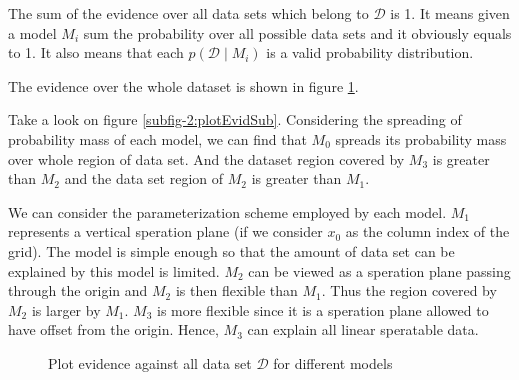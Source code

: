 \documentclass[12pt]{article}
\newenvironment{question}[2][Question]{\begin{trivlist}
\kern10pt
\item[\hskip \labelsep {\bfseries #1}\hskip \labelsep {\bfseries #2.}]}{\end{trivlist}}
\begin{document}
\begin{question}{22}
The sum of the evidence over all data sets which belong to $\mathcal{D}$ is 1. 
It means given a model $M_i$ sum the probability over all possible data sets 
and it obviously equals to 1. It also means that each
$p(\mathcal{D}\mid M_i)$ is a valid probability distribution.

The evidence over the whole dataset is shown in figure \ref{fig:PlotEvid}.

Take a look on figure \ref{subfig-2:plotEvidSub}.
Considering the spreading of probability mass of each model, we can find that
$M_0$ spreads its probability mass over whole region of data set. And the dataset
region covered by $M_3$ is greater than $M_2$ and the data set region of $M_2$ 
is greater than $M_1$.

We can consider the parameterization scheme employed by each model. 
$M_1$ represents
a vertical speration plane (if we consider $x_0$ as the column index of the grid).
The model is simple enough so that the amount of data set can be explained by this
model is limited. 
$M_2$ can be viewed as a speration plane passing through the origin and $M_2$ is then 
flexible than $M_1$. Thus the region covered by $M_2$ is larger by $M_1$.
$M_3$ is more flexible since it is a speration plane allowed to have offset from the
origin. Hence, $M_3$ can explain all linear speratable data.

\begin{figure}[h]
  \hfill
  \caption{Plot evidence against all data set $\mathcal{D}$ for different models}
  \label{fig:PlotEvid}
\end{figure}
\end{question}
\end{document}
